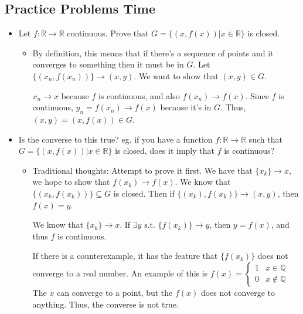 \documentclass{article}
\newcommand*{\txt}[1]{\text{ #1 }}%
\newcommand*{\rr}{\mathbb{R}}%
\newcommand*{\set}[1]{\{#1\}}%
\begin{document}
\subsection{Practice Problems Time}
\begin{itemize}
    \item Let $f:\rr\to\rr$ continuous. Prove that $G=\{(x,f(x))|x\in\rr\}$ is closed. 
    \begin{itemize}
        \item By definition, this means that if there's a sequence of points and it converges to something then it must be in $G$. Let $\{(x_n,f(x_n))\}\to (x,y)$. We want to show that $(x,y)\in G$. 
        
        $x_n\to x$ because $f$ is continuous, and also $f(x_n)\to f(x)$. Since $f$ is continuous, $y_n=f(x_n)\to f(x)$ because it's in $G$. Thus, $(x,y)=(x,f(x))\in G$.
    \end{itemize}
    \item Is the converse to this true? eg. if you have a function $f:\rr\to\rr$ such that $G=\{(x,f(x))|x\in\rr\}$ is closed, does it imply that $f$ is continuous?
    \begin{itemize}
        \item Traditional thoughts: Attempt to prove it first. We have that $\{x_k\}\to x$, we hope to show that $f(x_k)\to f(x)$. We know that $\{(x_k,f(x_k))\}\subseteq G$ is closed. Then if $\set{(x_k),f(x_k)}\to(x,y)$, then $f(x)=y$. 
        
        We know that $\set{x_k}\to x$. If $\exists y\txt{s.t.}\set{f(x_k)}\to y$, then $y=f(x)$, and thus $f$ is continuous.

        If there is a counterexample, it has the feature that $\{f(x_k)\}$ does not converge to a real number. An example of this is $f(x)=\begin{cases}
            1 & x\in \mathbb{Q} \\
            0 & x\notin \mathbb{Q}
        \end{cases}$ The $x$ can converge to a point, but the $f(x)$ does not converge to anything. Thus, the converse is not true.
        

\end{itemize}
\end{itemize}
\end{document}
